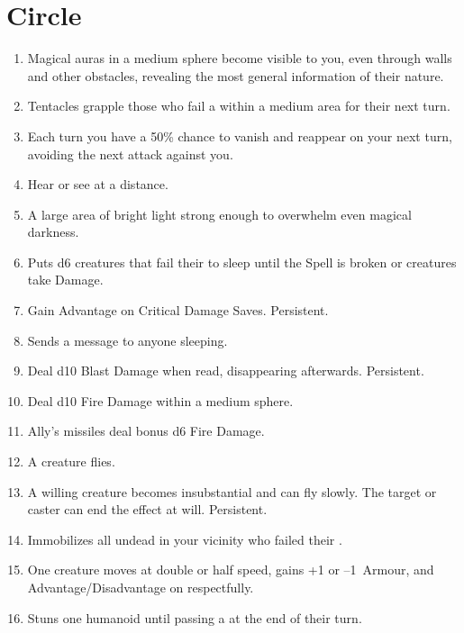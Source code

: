 \documentclass[itdr]{subfiles}
\begin{document}
\vfill
\break

\section{ Circle}
\def \spellcircle {3}
\begin{enumerate}
	\item {} Magical auras in a medium sphere become visible to you, even through walls and other obstacles, revealing the most general information of their nature.
	\item {} Tentacles grapple those who fail a  within a medium area for their next turn.
	\item {} Each turn you have a 50\% chance to vanish and reappear on your next turn, avoiding the next attack against you.
	\item {} Hear or see at a distance.
	\item {} A large area of bright light strong enough to overwhelm even magical darkness.
	\item {} Puts d6 creatures that fail their  to sleep until the Spell is broken or creatures take Damage.
	\item {} Gain Advantage on Critical Damage Saves. Persistent.
	\item {} Sends a message to anyone sleeping.
	\item {} Deal d10 Blast Damage when read, disappearing afterwards. Persistent.
	\item {} Deal d10 Fire Damage within a medium sphere.
	\item {} Ally's missiles deal bonus d6 Fire Damage.
	\item {} A creature flies.
	\item {} A willing creature becomes \mbox{insubstantial} and can fly slowly. The target or caster can end the effect at will. Persistent.
	\item {} Immobilizes all undead in your vicinity who failed their .
	\item {} One creature moves at double or half speed, gains +1 or --1~Armour, and Advantage/Disadvantage on  respectfully.
	\item {} Stuns one humanoid until passing a  at the end of their turn.

\end{enumerate}
\end{document}
